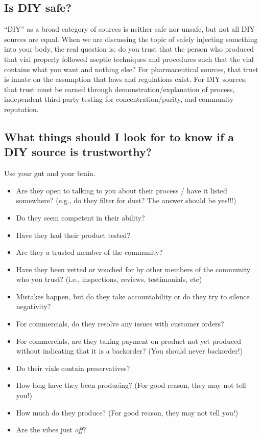 \documentclass{article}
\begin{document}
\subsection{Is DIY safe?}

“DIY” as a broad category of sources is neither safe nor unsafe, but not all DIY sources are equal. When we are discussing the topic of safely injecting something into your body, the real question is: do you trust that the person who produced that vial properly followed aseptic techniques and procedures such that the vial contains what you want and nothing else? For pharmaceutical sources, that trust is innate on the assumption that laws and regulations exist. For DIY sources, that trust must be earned through demonstration/explanation of process, independent third-party testing for concentration/purity, and community reputation.

\subsection{What things should I look for to know if a DIY source is trustworthy?}

Use your gut and your brain. 

\begin{itemize}
  \item Are they open to talking to you about their process / have it listed somewhere? (e.g., do they filter for dust? The answer should be yes!!!)
  \item Do they seem competent in their ability?
  \item Have they had their product tested? 
  \item Are they a trusted member of the community?
  \item Have they been vetted or vouched for by other members of the community who you trust? (i.e., inspections, reviews, testimonials, etc)
  \item Mistakes happen, but do they take accountability or do they try to silence negativity?
  \item For commercials, do they resolve any issues with customer orders?
  \item For commercials, are they taking payment on product not yet produced without indicating that it is a backorder? (You should never backorder!)
  \item Do their vials contain preservatives?
  \item How long have they been producing? (For good reason, they may not tell you!)
  \item How much do they produce? (For good reason, they may not tell you!)
  \item Are the vibes just \textit{off}?
\end{itemize}
\end{document}
